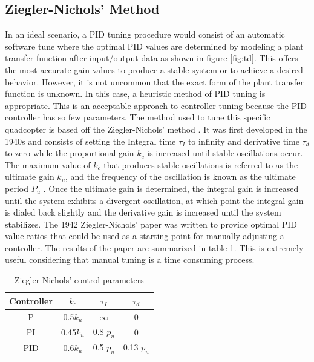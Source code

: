 \documentclass[11pt]{ucthesis}
\begin{document}
\subsection{Ziegler-Nichols’ Method}
In an ideal scenario, a PID tuning procedure would consist of an automatic software tune where the optimal PID values are determined by modeling a plant transfer function after input/output data as shown in figure \ref{fig:td}. This offers the most accurate gain values to produce a stable system or to achieve a desired behavior. However, it is not uncommon that the exact form of the plant transfer function is unknown. In this case, a heuristic method of PID tuning is appropriate. This is an acceptable approach to controller tuning because the PID controller has so few parameters. The method used to tune this specific quadcopter is based off the Ziegler-Nichols’ method \cite{aastrom2010feedback}. It was first developed in the 1940s and consists of setting the Integral time $\tau_I$ to infinity and derivative time $\tau_d$ to zero while the proportional gain $k_c$ is increased until stable oscillations occur. The maximum value of $k_c$ that produces stable oscillations is referred to as the ultimate gain $k_u$, and the frequency of the oscillation is known as the ultimate period $P_u$ \cite{wang2020pid}. Once the ultimate gain is determined, the integral gain is increased until the system exhibits a divergent oscillation, at which point the integral gain is dialed back slightly and the derivative gain is increased until the system stabilizes. The 1942 Ziegler-Nichols’ paper \cite{ziegler1942optimum} was written to provide optimal PID value ratios that could be used as a starting point for manually adjusting a controller. The results of the paper are summarized in table \ref{tab:Ziegler-Nichols’ control parameters}. This is extremely useful considering that manual tuning is a time consuming process. 
\begin{table}[H]
	\begin{center}
		\begin{tabular}{ |c|c|c|c| } 
			\hline
			Controller & $k_c$ & $\tau_I$ &  $\tau_d$ \\
			\hline
			P & 0.5$k_u$ & $\infty$ & 0\\ 
			PI & 0.45$k_u$ & 0.8 $p_u$ & 0\\ 
		 	PID & 0.6$k_u$ & 0.5 $p_u$ & 0.13 $p_u$\\ 
			\hline	
		\end{tabular}
	\caption{Ziegler-Nichols’ control parameters}
	\label{tab:Ziegler-Nichols’ control parameters}
	\end{center}
\end{table}
\end{document}
